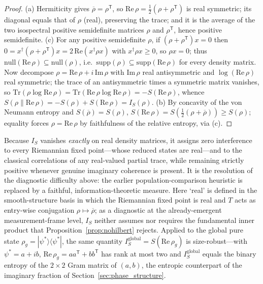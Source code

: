 \documentclass[12pt,a4paper]{article}
\theoremstyle{definition}
\theoremstyle{remark}
\begin{document}
\begin{proof}
(a) Hermiticity gives $\overline{\rho} = \rho^{\mathsf T}$, so
$\mathrm{Re}\,\rho = \tfrac12(\rho + \rho^{\mathsf T})$ is real symmetric;
its diagonal equals that of $\rho$ (real), preserving the trace; and it is
the average of the two isospectral positive semidefinite matrices $\rho$
and $\rho^{\mathsf T}$, hence positive semidefinite. (c) For any positive
semidefinite $\rho$, if $(\rho+\rho^{\mathsf T})x=0$ then
$0 = x^{\dagger}(\rho+\rho^{\mathsf T})x = 2\,\mathrm{Re}(x^{\dagger}\rho x)$
with $x^{\dagger}\rho x\geq 0$, so $\rho x = 0$; thus
$\mathrm{null}(\mathrm{Re}\,\rho)\subseteq\mathrm{null}(\rho)$, i.e.\
$\mathrm{supp}(\rho)\subseteq\mathrm{supp}(\mathrm{Re}\,\rho)$ for every
density matrix. Now decompose $\rho = \mathrm{Re}\,\rho + i\,\mathrm{Im}\,\rho$ with
$\mathrm{Im}\,\rho$ real antisymmetric and $\log(\mathrm{Re}\,\rho)$ real
symmetric; the trace of an antisymmetric times a symmetric matrix vanishes,
so $\mathrm{Tr}(\rho \log \mathrm{Re}\,\rho) = \mathrm{Tr}(\mathrm{Re}\,\rho
\log \mathrm{Re}\,\rho) = -S(\mathrm{Re}\,\rho)$, whence
$S(\rho\|\mathrm{Re}\,\rho) = -S(\rho) + S(\mathrm{Re}\,\rho) = I_S(\rho)$.
(b) By concavity of the von Neumann entropy and $S(\overline\rho) =
S(\rho)$, $S(\mathrm{Re}\,\rho) = S(\tfrac12(\rho+\overline\rho)) \geq
S(\rho)$; equality forces $\rho = \mathrm{Re}\,\rho$ by faithfulness of the
relative entropy, via (c).
\end{proof}

Because $I_S$ vanishes \emph{exactly} on real density matrices, it assigns
zero interference to every Riemannian fixed point---whose reduced states
are real---and to the classical correlations of any real-valued partial
trace, while remaining strictly positive whenever genuine imaginary
coherence is present. It is the resolution of the diagnostic difficulty
above: the earlier population-comparison heuristic is replaced by a
faithful, information-theoretic measure. Here `real' is defined in the
smooth-structure basis in which the Riemannian fixed point is real and $T$
acts as entry-wise conjugation $\rho\mapsto\overline\rho$; as a diagnostic
at the already-emergent measurement-frame level, $I_S$ neither assumes nor
requires the fundamental inner product that Proposition~\ref{prop:nohilbert}
rejects. Applied to the global pure state
$\rho_g = |\psi^*\rangle\langle\psi^*|$, the same quantity
$I_S^{\mathrm{global}} = S(\mathrm{Re}\,\rho_g)$ is size-robust---with
$\psi^* = a + i b$, $\mathrm{Re}\,\rho_g = a a^{\mathsf T} + b b^{\mathsf
T}$ has rank at most two and $I_S^{\mathrm{global}}$ equals the binary
entropy of the $2\times2$ Gram matrix of $(a,b)$, the entropic counterpart
of the imaginary fraction of Section~\ref{sec:phase_structure}.
\end{document}
